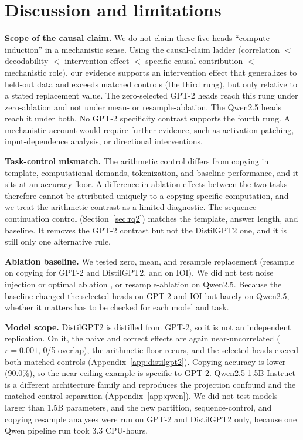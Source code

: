 \documentclass{article}
\begin{document}
\section{Discussion and limitations}
\label{sec:discussion}

\textbf{Scope of the causal claim.} We do not claim these five heads
``compute induction'' in a mechanistic sense. Using the causal-claim
ladder (correlation $<$ decodability $<$ intervention effect $<$
specific causal contribution $<$ mechanistic role), our evidence
supports an intervention effect that generalizes to held-out data and
exceeds matched controls (the third rung), but only relative to a stated replacement
value. The zero-selected GPT-2 heads reach this rung under zero-ablation
and not under mean- or resample-ablation. The Qwen2.5 heads reach it under both. No
GPT-2 specificity contrast supports the fourth rung. A mechanistic
account would require further evidence, such as activation patching,
input-dependence analysis, or directional interventions.

\textbf{Task-control mismatch.} The arithmetic control differs from
copying in template, computational demands, tokenization, and baseline
performance, and it sits at an accuracy floor. A difference in ablation
effects between the two tasks therefore cannot be attributed uniquely to
a copying-specific computation, and we treat the arithmetic contrast as
a limited diagnostic. The sequence-continuation control
(Section~\ref{sec:rq2}) matches the template, answer length, and
baseline. It removes the GPT-2 contrast but not the DistilGPT2 one, and
it is still only one alternative rule.

\textbf{Ablation baseline.} We tested zero, mean, and resample
replacement (resample on copying for GPT-2 and DistilGPT2, and on IOI).
We did not test noise injection or optimal
ablation \citep{li2024optimal}, or resample-ablation on Qwen2.5. Because the baseline changed the selected
heads on GPT-2 and IOI but barely on Qwen2.5, whether it matters has to
be checked for each model and task.

\textbf{Model scope.} DistilGPT2 is distilled from GPT-2, so it is not an
independent replication. On it, the naive and correct effects are again
near-uncorrelated ($r=0.001$, 0/5 overlap), the arithmetic floor recurs,
and the selected heads exceed both matched controls
(Appendix~\ref{app:distilgpt2}). Copying accuracy is lower (90.0\%), so
the near-ceiling example is specific to GPT-2. Qwen2.5-1.5B-Instruct is
a different architecture family and reproduces the projection confound
and the matched-control separation (Appendix~\ref{app:qwen}). We did not
test models larger than 1.5B parameters, and the new partition,
sequence-control, and copying resample analyses were run on GPT-2 and
DistilGPT2 only, because
one Qwen pipeline run took 3.3 CPU-hours.
\end{document}
